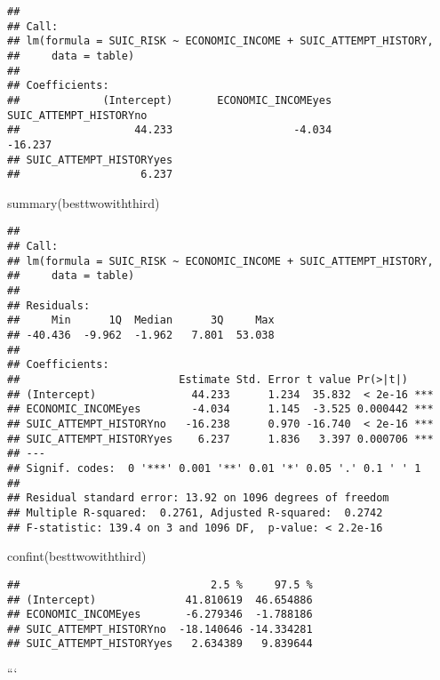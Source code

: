\documentclass[
]{book}
\newenvironment{Shaded}{\begin{snugshade}}{\end{snugshade}}
\newcommand{\FunctionTok}[1]{\textcolor[rgb]{0.00,0.00,0.00}{#1}}
\newcommand{\NormalTok}[1]{#1}
\begin{document}
\begin{verbatim}
## 
## Call:
## lm(formula = SUIC_RISK ~ ECONOMIC_INCOME + SUIC_ATTEMPT_HISTORY, 
##     data = table)
## 
## Coefficients:
##             (Intercept)       ECONOMIC_INCOMEyes   SUIC_ATTEMPT_HISTORYno  
##                  44.233                   -4.034                  -16.237  
## SUIC_ATTEMPT_HISTORYyes  
##                   6.237
\end{verbatim}

\begin{Shaded}
\begin{Highlighting}[]
\FunctionTok{summary}\NormalTok{(besttwowiththird)}
\end{Highlighting}
\end{Shaded}

\begin{verbatim}
## 
## Call:
## lm(formula = SUIC_RISK ~ ECONOMIC_INCOME + SUIC_ATTEMPT_HISTORY, 
##     data = table)
## 
## Residuals:
##     Min      1Q  Median      3Q     Max 
## -40.436  -9.962  -1.962   7.801  53.038 
## 
## Coefficients:
##                         Estimate Std. Error t value Pr(>|t|)    
## (Intercept)               44.233      1.234  35.832  < 2e-16 ***
## ECONOMIC_INCOMEyes        -4.034      1.145  -3.525 0.000442 ***
## SUIC_ATTEMPT_HISTORYno   -16.238      0.970 -16.740  < 2e-16 ***
## SUIC_ATTEMPT_HISTORYyes    6.237      1.836   3.397 0.000706 ***
## ---
## Signif. codes:  0 '***' 0.001 '**' 0.01 '*' 0.05 '.' 0.1 ' ' 1
## 
## Residual standard error: 13.92 on 1096 degrees of freedom
## Multiple R-squared:  0.2761, Adjusted R-squared:  0.2742 
## F-statistic: 139.4 on 3 and 1096 DF,  p-value: < 2.2e-16
\end{verbatim}

\begin{Shaded}
\begin{Highlighting}[]
\FunctionTok{confint}\NormalTok{(besttwowiththird)}
\end{Highlighting}
\end{Shaded}

\begin{verbatim}
##                              2.5 %     97.5 %
## (Intercept)              41.810619  46.654886
## ECONOMIC_INCOMEyes       -6.279346  -1.788186
## SUIC_ATTEMPT_HISTORYno  -18.140646 -14.334281
## SUIC_ATTEMPT_HISTORYyes   2.634389   9.839644
\end{verbatim}

```

  
\end{document}
